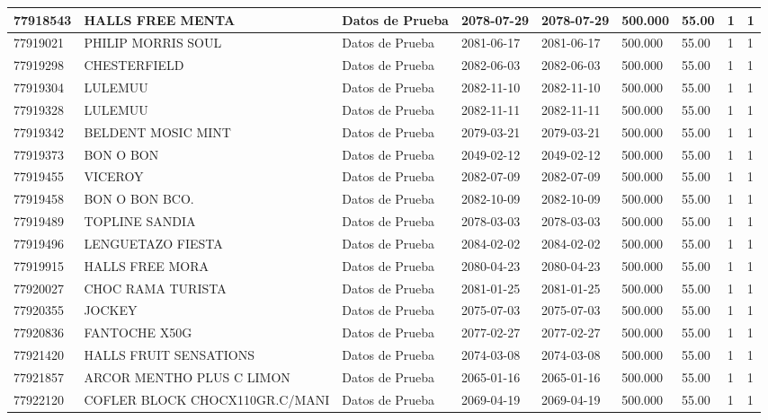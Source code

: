 \documentclass[a4paper,12pt]{article}
\begin{document}
\begin{landscape}
\begin{longtable}{|p{4cm}|p{2.5cm}|p{2.5cm}|p{1.8cm}|p{1.8cm}|p{1cm}|p{1cm}|p{3cm}|p{3cm}||}
77918543 & HALLS FREE MENTA & Datos de Prueba & 2078-07-29 & 2078-07-29 & 500.000 & 55.00 & 1 & 1 \\ \hline 
77919021 & PHILIP MORRIS SOUL & Datos de Prueba & 2081-06-17 & 2081-06-17 & 500.000 & 55.00 & 1 & 1 \\ \hline 
77919298 & CHESTERFIELD & Datos de Prueba & 2082-06-03 & 2082-06-03 & 500.000 & 55.00 & 1 & 1 \\ \hline 
77919304 & LULEMUU & Datos de Prueba & 2082-11-10 & 2082-11-10 & 500.000 & 55.00 & 1 & 1 \\ \hline 
77919328 & LULEMUU & Datos de Prueba & 2082-11-11 & 2082-11-11 & 500.000 & 55.00 & 1 & 1 \\ \hline 
77919342 & BELDENT MOSIC MINT & Datos de Prueba & 2079-03-21 & 2079-03-21 & 500.000 & 55.00 & 1 & 1 \\ \hline 
77919373 & BON O BON & Datos de Prueba & 2049-02-12 & 2049-02-12 & 500.000 & 55.00 & 1 & 1 \\ \hline 
77919455 & VICEROY & Datos de Prueba & 2082-07-09 & 2082-07-09 & 500.000 & 55.00 & 1 & 1 \\ \hline 
77919458 & BON O BON BCO. & Datos de Prueba & 2082-10-09 & 2082-10-09 & 500.000 & 55.00 & 1 & 1 \\ \hline 
77919489 & TOPLINE SANDIA & Datos de Prueba & 2078-03-03 & 2078-03-03 & 500.000 & 55.00 & 1 & 1 \\ \hline 
77919496 & LENGUETAZO FIESTA & Datos de Prueba & 2084-02-02 & 2084-02-02 & 500.000 & 55.00 & 1 & 1 \\ \hline 
77919915 & HALLS FREE MORA & Datos de Prueba & 2080-04-23 & 2080-04-23 & 500.000 & 55.00 & 1 & 1 \\ \hline 
77920027 & CHOC RAMA TURISTA & Datos de Prueba & 2081-01-25 & 2081-01-25 & 500.000 & 55.00 & 1 & 1 \\ \hline 
77920355 & JOCKEY & Datos de Prueba & 2075-07-03 & 2075-07-03 & 500.000 & 55.00 & 1 & 1 \\ \hline 
77920836 & FANTOCHE X50G & Datos de Prueba & 2077-02-27 & 2077-02-27 & 500.000 & 55.00 & 1 & 1 \\ \hline 
77921420 & HALLS FRUIT SENSATIONS & Datos de Prueba & 2074-03-08 & 2074-03-08 & 500.000 & 55.00 & 1 & 1 \\ \hline 
77921857 & ARCOR MENTHO PLUS C LIMON & Datos de Prueba & 2065-01-16 & 2065-01-16 & 500.000 & 55.00 & 1 & 1 \\ \hline 
77922120 & COFLER BLOCK CHOCX110GR.C/MANI & Datos de Prueba & 2069-04-19 & 2069-04-19 & 500.000 & 55.00 & 1 & 1 \\ \hline 

\end{longtable}
\end{landscape}
\end{document}
